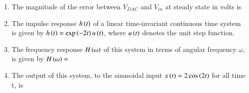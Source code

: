 \documentclass[a4paper, 11pt]{article}
\begin{document}
\begin{enumerate}
    \item The magnitude of the error between $V_{DAC}$ and $V_{in}$ at steady state in volts is
    \begin{enumerate}
    \end{enumerate}
    
    \hfill{}
    
    \item[] The impulse response $h\left(t\right)$ of a linear time-invariant continuous time system is given by $h\left(t\right)=\exp\left(-2t\right)u\left(t\right)$, where $u\left(t\right)$ denotes the unit step function.
    
    \item The frequency response $H\left(\omega\right)$ of this system in terms of angular frequency $\omega$, is given by $H\left(\omega\right)=$
    \begin{enumerate}
    \end{enumerate}
    
    \hfill{}
    
    \item The output of this system, to the sinusoidal input $x\left(t\right) = 2\cos\left(2t\right)$ for all time t, is
    \begin{enumerate}
    \end{enumerate}
    
    \hfill{}

\end{enumerate}
\end{document}
